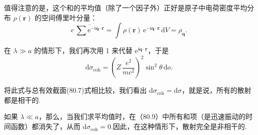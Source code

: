 值得注意的是，这个和的平均值（除了一个因子外）正好是原子中电荷密度平均分布 $\rho(\boldsymbol{r})$ 的空间傅里叶分量：
\begin{equation}
  e\,\overline{\sum\mathrm{e}^{-\mathrm{i}\boldsymbol{q}\cdot\boldsymbol{r}}}
  =\int\rho(\boldsymbol{r})\,\mathrm{e}^{-\mathrm{i}\boldsymbol{q}\cdot\boldsymbol{r}}\,\mathrm{d}V
  =\rho_{\boldsymbol{q}}.
\end{equation}

在 $\lambda\gg a$ 的情形下，我们再次用 1 来代替 $\mathrm{e}^{\mathrm{i}\boldsymbol{q}\cdot\boldsymbol{r}}$，于是
\begin{equation}
  \mathrm{d}\sigma_{\mathrm{coh}}=\left(Z\,\frac{e^2}{mc^2}\right)^{\!2}
  \sin^2\theta\,\mathrm{d}o.
\end{equation}

将此式与总有效截面(80.7)式相比较，我们看出 $\mathrm{d}\sigma_{\mathrm{coh}}=\mathrm{d}\sigma$，就是说，所有的散射都是相干的.

如果 $\lambda\ll a$，那么，当我们求平均值时，在（80.9）中所有和项（是迅速振动的时间函数）都消失了，从而 $\mathrm{d}\sigma_{\mathrm{coh}}=0$.因此，在这种情形下，散射完全是非相干的.
